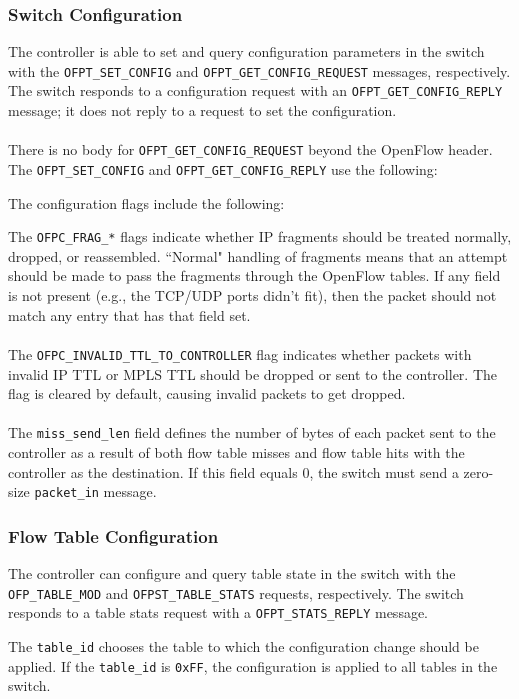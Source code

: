 \subsubsection{Switch Configuration}
\label{sec:switch_config}
The controller is able to set and query configuration parameters in the switch with the \verb|OFPT_SET_CONFIG| and \verb|OFPT_GET_CONFIG_REQUEST| messages, respectively.  The switch responds to a configuration request with an \verb|OFPT_GET_CONFIG_REPLY| message; it does not reply to a request to set the configuration.  
\\\\
There is no body for \verb|OFPT_GET_CONFIG_REQUEST| beyond the OpenFlow header.  The \verb|OFPT_SET_CONFIG| and \verb|OFPT_GET_CONFIG_REPLY| use the following:


The configuration flags include the following:


The \verb|OFPC_FRAG_*| flags indicate whether IP fragments should be treated normally, dropped, or reassembled.  ``Normal" handling of fragments means that an attempt should be made to pass the fragments through the OpenFlow tables. If any field is not present (e.g., the TCP/UDP ports didn't fit), then the packet should not match any entry that has that field set.
\\\\
The \verb|OFPC_INVALID_TTL_TO_CONTROLLER| flag indicates whether packets with invalid IP TTL or MPLS TTL should be dropped or sent to the controller.  The flag is cleared by default, causing invalid packets to get dropped.
\\\\
The \verb|miss_send_len| field defines the number of bytes of each packet sent to the controller as a result of both flow table misses and flow table hits with the controller as the destination.  If this field equals 0, the switch must send a zero-size \verb|packet_in| message.

\subsubsection{Flow Table Configuration}
The controller can configure and query table state in the switch with the \verb|OFP_TABLE_MOD| and \verb|OFPST_TABLE_STATS| requests, respectively. The switch responds to a table stats request with a \verb|OFPT_STATS_REPLY| message.


The \verb|table_id| chooses the table to which the configuration change should be applied. If the \verb|table_id| is \verb|0xFF|, the configuration is applied to all tables in the switch.

